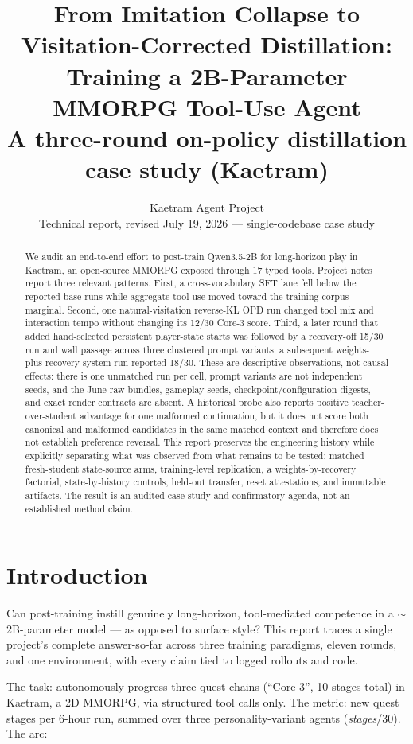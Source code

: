 \documentclass[11pt]{article}
\title{From Imitation Collapse to Visitation-Corrected Distillation:\\
Training a 2B-Parameter MMORPG Tool-Use Agent\\
\large A three-round on-policy distillation case study (Kaetram)}
\author{Kaetram Agent Project\\ \small Technical report, revised July 19, 2026 --- single-codebase case study}
\date{}
\begin{document}
\maketitle

\begin{abstract}
We audit an end-to-end effort to post-train Qwen3.5-2B for long-horizon play in Kaetram, an
open-source MMORPG exposed through 17 typed tools. Project notes report three relevant patterns.
First, a cross-vocabulary SFT lane fell below the reported base runs while aggregate tool use moved
toward the training-corpus marginal. Second, one natural-visitation reverse-KL OPD run changed tool
mix and interaction tempo without changing its 12/30 Core-3 score. Third, a later round that added
hand-selected persistent player-state starts was followed by a recovery-off 15/30 run and wall
passage across three clustered prompt variants; a subsequent weights-plus-recovery system run
reported 18/30. These are descriptive observations, not causal effects: there is one unmatched run
per cell, prompt variants are not independent seeds, and the June raw bundles, gameplay seeds,
checkpoint/configuration digests, and exact render contracts are absent. A historical probe also
reports positive teacher-over-student advantage for one malformed continuation, but it does not
score both canonical and malformed candidates in the same matched context and therefore does not
establish preference reversal. This report preserves the engineering history while explicitly
separating what was observed from what remains to be tested: matched fresh-student state-source
arms, training-level replication, a weights-by-recovery factorial, state-by-history controls,
held-out transfer, reset attestations, and immutable artifacts. The result is an audited case study
and confirmatory agenda, not an established method claim.
\end{abstract}

\section{Introduction}

Can post-training instill genuinely long-horizon, tool-mediated competence in a $\sim$2B-parameter
model --- as opposed to surface style? This report traces a single project's complete answer-so-far
across three training paradigms, eleven rounds, and one environment, with every claim tied to
logged rollouts and code.

The task: autonomously progress three quest chains (``Core 3'', 10 stages total) in Kaetram, a 2D
MMORPG, via structured tool calls only. The metric: new quest stages per 6-hour run, summed over
three personality-variant agents (\emph{stages}/30). The arc:
\end{document}
